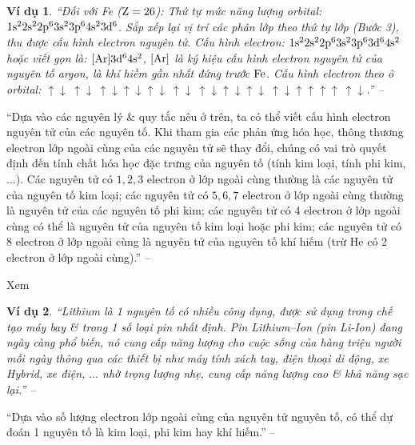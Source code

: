 \documentclass[oneside]{book}
\numberwithin{equation}{section}
\newtheorem{vidu}{Ví dụ}[section]
\begin{document}
\begin{vidu}
	``Đối với Fe ($\rm Z = 26$): Thứ tự mức năng lượng orbital: $\rm 1s^22s^22p^63s^23p^64s^23d^6$. Sắp xếp lại vị trí các phân lớp theo thứ tự lớp (Bước 3), thu được cấu hình electron nguyên tử. Cấu hình electron: $\rm 1s^22s^22p^63s^23p^63d^64s^2$ hoặc viết gọn là: $\rm[Ar]3d^64s^2$, $\rm[Ar]$ là ký hiệu cấu hình electron nguyên tử của nguyên tố argon, là khí hiềm gần nhất đứng trước $\rm Fe$. Cấu hình electron theo ô orbital: $\boxed{\uparrow\downarrow}\ \boxed{\uparrow\downarrow}\ \boxed{\uparrow\downarrow}\boxed{\uparrow\downarrow}\boxed{\uparrow\downarrow}\ \boxed{\uparrow\downarrow}\ \boxed{\uparrow\downarrow}\boxed{\uparrow\downarrow}\boxed{\uparrow\downarrow}\ \boxed{\uparrow\downarrow}\boxed{\uparrow}\boxed{\uparrow}\boxed{\uparrow}\boxed{\uparrow}\ \boxed{\uparrow\downarrow}$.'' -- \cite[p. 32]{SGK_Hoa_Hoc_10_Chan_Troi_Sang_Tao}
\end{vidu}
``Dựa vào các nguyên lý \& quy tắc nêu ở trên, ta có thể viết cấu hình electron nguyên tử của các nguyên tố. Khi tham gia các phản ứng hóa học, thông thương electron lớp ngoài cùng của các nguyên tử sẽ thay đổi, chúng có vai trò quyết định đến tính chất hóa học đặc trưng của nguyên tố (tính kim loại, tính phi kim, $\ldots$). Các nguyên tử có $1,2,3$ electron ở lớp ngoài cùng thường là các nguyên tử của nguyên tố kim loại; các nguyên tử có $5,6,7$ electron ở lớp ngoài cùng thường là nguyên tử của các nguyên tố phi kim; các nguyên tử có 4 electron ở lớp ngoài cùng có thể là nguyên tử của nguyên tố kim loại hoặc phi kim; các nguyên tử có 8 electron ở lớp ngoài cùng là nguyên tử của nguyên tố khí hiếm (trừ He có 2 electron ở lớp ngoài cùng).'' -- \cite[p. 33]{SGK_Hoa_Hoc_10_Chan_Troi_Sang_Tao}

Xem \cite[Bảng 4.2: \textsf{Cấu hình electron nguyên tử của 1 số nguyên tố}, p. 33]{SGK_Hoa_Hoc_10_Chan_Troi_Sang_Tao}

\begin{vidu}
	``Lithium là 1 nguyên tố có nhiều công dụng, được sử dụng trong chế tạo máy bay \& trong 1 số loại pin nhất định. Pin Lithium--Ion (pin Li-Ion) đang ngày càng phổ biến, nó cung cấp năng lượng cho cuộc sống của hàng triệu người mỗi ngày thông qua các thiết  bị như máy tính xách tay, điện thoại di động, xe Hybrid, xe điện, $\ldots$ nhờ trọng lượng nhẹ, cung cấp năng lượng cao \& khả năng sạc lại.'' -- \cite[p. 33]{SGK_Hoa_Hoc_10_Chan_Troi_Sang_Tao}
\end{vidu}
``Dựa vào số lượng electron lớp ngoài cùng của nguyên tử nguyên tố, có thể dự đoán 1 nguyên tố là kim loại, phi kim hay khí hiếm.'' -- \cite[p. 33]{SGK_Hoa_Hoc_10_Chan_Troi_Sang_Tao}
\end{document}

